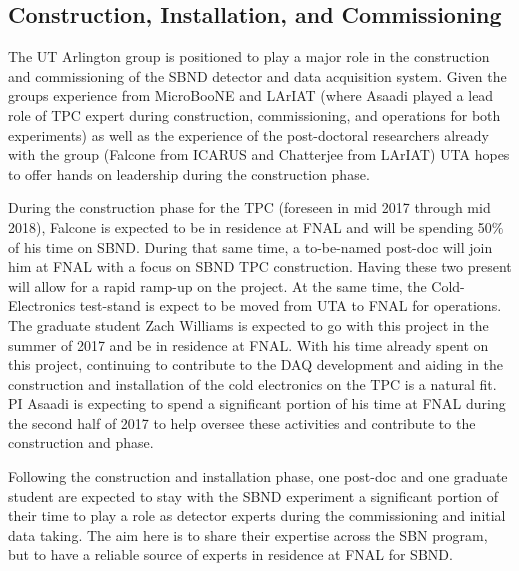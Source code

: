 \subsection{Construction, Installation, and Commissioning}\label{sec:SBNDBulid}
The UT Arlington group is positioned to play a major role in the construction and commissioning of the SBND detector and data acquisition system. Given the groups experience from MicroBooNE and LArIAT (where Asaadi played a lead role of TPC expert during construction, commissioning, and operations for both experiments) as well as the experience of the post-doctoral researchers already with the group (Falcone from ICARUS and Chatterjee from LArIAT) UTA hopes to offer hands on leadership during the construction phase.

During the construction phase for the TPC (foreseen in mid 2017 through mid 2018), Falcone is expected to be in residence at FNAL and will be spending 50$\%$ of his time on SBND. During that same time, a to-be-named post-doc will join him at FNAL with a focus on SBND TPC construction. Having these two present will allow for a rapid ramp-up on the project. At the same time, the Cold-Electronics test-stand is expect to be moved from UTA to FNAL for operations. The graduate student Zach Williams is expected to go with this project in the summer of 2017 and be in residence at FNAL. With his time already spent on this project, continuing to contribute to the DAQ development and aiding in the construction and installation of the cold electronics on the TPC is a natural fit. PI Asaadi is expecting to spend a significant portion of his time at FNAL during the second half of 2017 to help oversee these activities and contribute to the construction and phase.

Following the construction and installation phase, one post-doc and one graduate student are expected to stay with the SBND experiment a significant portion of their time to play a role as detector experts during the commissioning and initial data taking. The aim here is to share their expertise across the SBN program, but to have a reliable source of experts in residence at FNAL for SBND. 





